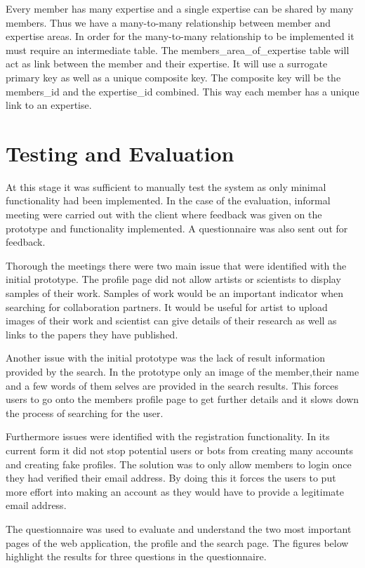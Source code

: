 \documentclass[a4paper,oneside,11pt]{report}
\begin{document}
Every member has many expertise and a single expertise can be shared by many members. Thus we have a many-to-many relationship between member and expertise areas. In order for the many-to-many relationship to be implemented it must require an intermediate table. The members\_area\_of\_expertise table will act as link between the member and their expertise. It will use a surrogate primary key as well as a unique composite key. The composite key will be the members\_id and the expertise\_id combined. This way each member has a unique link to an expertise.
\section{Testing and Evaluation}
At this stage it was sufficient to manually test the system as only minimal functionality had been implemented. In the case of the evaluation, informal meeting were carried out with the client where feedback was given on the prototype and functionality implemented.  A questionnaire was also sent out for feedback.

Thorough the meetings there were two main issue that were identified with the initial prototype. The profile page did not allow artists or scientists to display samples of their work. Samples of work would be an important indicator when searching for collaboration partners. It would be useful for artist to upload images of their work and scientist can give details of their research as well as links to the papers they have published.

Another issue with the initial prototype was the lack of result information provided by the search. In the prototype only an image of the member,their name and a few words of them selves are provided in the search results. This forces users to go onto the members profile page to get further details and it slows down the process of searching for the user.

Furthermore issues were identified with the registration functionality. In its current form it did not stop potential users or bots from creating many accounts and creating fake profiles. The solution was to only allow members to login once they had verified their email address. By doing this it forces the users to put more effort into making an account as they would have to provide a legitimate email address.

The questionnaire was used to evaluate and understand the two most important pages of the web application, the profile and the search page. The figures below highlight the results for three questions in the questionnaire.
\end{document}
